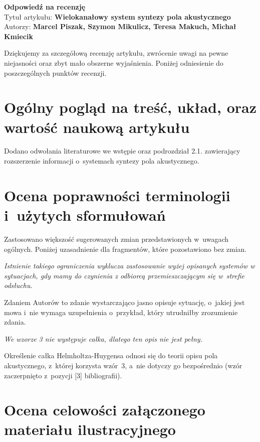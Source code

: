 \documentclass[12pt]{article}
\begin{document}
    \begin{center}
        \textbf{\large Odpowiedź na recenzję }\\
        \vspace{10pt}
        Tytuł artykułu: \textbf{Wielokanałowy system syntezy pola akustycznego} \\
        Autorzy: \textbf{Marcel Piszak, Szymon Mikulicz, Teresa Makuch, Michał Kmiecik}
    \end{center}

    Dziękujemy za szczegółową recenzję artykułu, zwrócenie uwagi na pewne
    niejasności oraz zbyt mało obszerne wyjaśnienia. Poniżej odniesienie do
    poszczególnych punktów recenzji.

    \section{Ogólny pogląd na treść, układ, oraz wartość naukową artykułu}

    Dodano odwołania literaturowe we wstępie oraz podrozdział 2.1. zawierający
    rozszerzenie informacji o~systemach syntezy pola akustycznego.

    \section{Ocena poprawności terminologii i~użytych sformułowań}

    Zastosowano większość sugerowanych zmian przedstawionych w~uwagach ogólnych. Poniżej uzasadnienie dla fragmentów, które pozostawiono bez zmian.

    \textit{Istnienie takiego ograniczenia wyklucza zastosowanie wyżej opisanych systemów w sytuacjach, gdy mamy do czynienia z odbiorcą przemieszczającym się w~strefie odsłuchu.}

    Zdaniem Autorów to zdanie wystarczająco jasno opisuje sytuację, o~jakiej jest mowa i~nie wymaga uzupełnienia o~przykład, który utrudniłby zrozumienie zdania.

    \textit{We wzorze 3 nie występuje całka, dlatego ten opis nie jest pełny.}

    Określenie całka Helmholtza-Huygensa odnosi się do teorii opisu pola akustycznego, z~której korzysta wzór~3, a~nie dotyczy go bezpośrednio (wzór zaczerpnięto z~pozycji [3] bibliografii).

    \section{Ocena celowości załączonego materiału ilustracyjnego}
\end{document}
